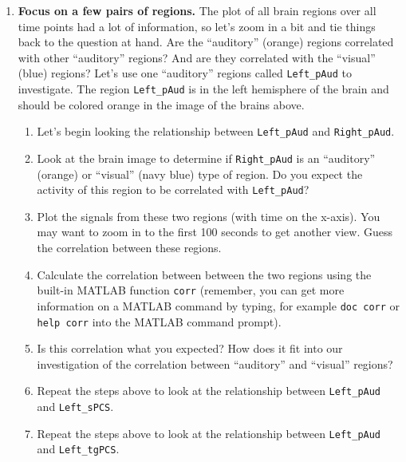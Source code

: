 \begin{prob}
\begin{enumerate}
\item \textbf{Focus on a few pairs of regions.} The plot of all brain regions over all time points had a lot of information, so let's zoom in a bit and tie things back to the question at hand. Are the ``auditory'' (orange) regions correlated with other ``auditory'' regions? And are they correlated with the ``visual'' (blue) regions?  Let's use one ``auditory'' regions called \texttt{Left\_pAud} to investigate. The region \texttt{Left\_pAud} is in the left hemisphere of the brain and should be colored orange in the image of the brains above.

\begin{enumerate}
\item Let's begin looking the relationship between \texttt{Left\_pAud} and \texttt{Right\_pAud}.
\item Look at the brain image to determine if \texttt{Right\_pAud} is an ``auditory'' (orange) or ``visual'' (navy blue) type of region. Do you expect the activity of this region to be correlated with \texttt{Left\_pAud}?
\item Plot the signals from these two regions (with time on the x-axis). You may want to zoom in to the first 100 seconds to get another view. Guess the correlation between these regions.
\item Calculate the correlation between between the two regions using the built-in MATLAB function \texttt{corr} (remember, you can get more information on a MATLAB command by typing, for example \texttt{doc corr} or \texttt{help corr} into the MATLAB command prompt).
\item Is this correlation what you expected? How does it fit into our investigation of the correlation between ``auditory'' and ``visual'' regions?

\item Repeat the steps above to look at the relationship between \texttt{Left\_pAud} and \texttt{Left\_sPCS}.
\item Repeat the steps above to look at the relationship between \texttt{Left\_pAud} and \texttt{Left\_tgPCS}.

\end{enumerate}


\end{enumerate}
\end{prob}
